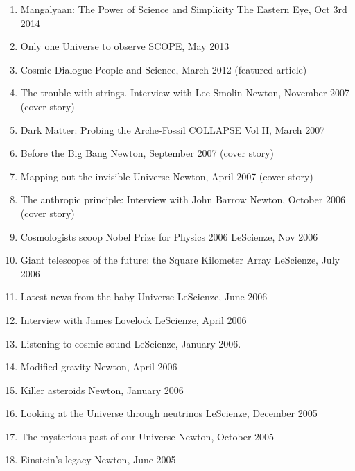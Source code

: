 \begin{enumerate}
\item
{}
{Mangalyaan: The Power of Science and Simplicity}
{The Eastern Eye, Oct 3rd 2014}

\item
{}
{Only one Universe to observe}
{SCOPE, May 2013}

\item
{}
{Cosmic Dialogue}
{People and Science, March 2012 (featured article)}

\item
{}
{The trouble with strings. Interview with Lee Smolin}
{Newton,  November 2007 (cover story)}

\item
{}
{Dark Matter: Probing the Arche-Fossil}
{COLLAPSE Vol II, March 2007}

\item
{}
{Before the Big Bang}
{Newton, September 2007 (cover story)}

\item
{}
{Mapping out the invisible Universe}
{Newton, April 2007 (cover story)}

\item
{}
{The anthropic principle: Interview with John Barrow}
{Newton, October 2006 (cover story)}

\item
{}
{Cosmologists scoop Nobel Prize for Physics 2006}
{LeScienze, Nov 2006}

\item
{}
{Giant telescopes of the future: the Square Kilometer Array}
{LeScienze, July 2006}

\item
{}
{Latest news from the baby Universe}
{LeScienze, June 2006}

\item
{}
{Interview with James Lovelock}
{LeScienze, April 2006}

\item
{}
{Listening to cosmic sound}
{LeScienze, January 2006.}

\item
{}
{Modified gravity}
{Newton, April 2006}

\item
{}
{Killer asteroids}
{Newton, January 2006}

\item
{}
{Looking at the Universe through neutrinos}
{LeScienze, December 2005}

\item
{}
{The mysterious past of our Universe}
{Newton, October 2005}

\item
{}
{Einstein's legacy}
{Newton, June 2005} \label{lastpage}
\end{enumerate}
\setcounter{nPEOtherPubs}{\value{enumi}}
\setcounter{nAllPEPubs}{\value{nPEBooks}}
\addtocounter{nAllPEPubs}{\value{nPEBookChapters}}
\addtocounter{nAllPEPubs}{\value{nPEOtherPubs}}

